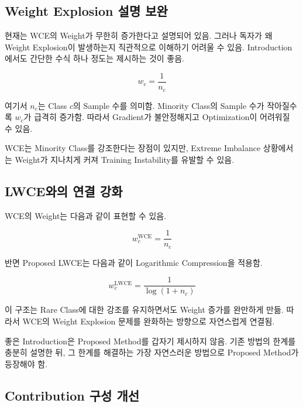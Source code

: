 \documentclass[11pt,a4paper]{article}
\begin{document}
\subsection{Weight Explosion 설명 보완}

현재는 WCE의 Weight가 무한히 증가한다고 설명되어 있음. 그러나 독자가 왜 Weight Explosion이 발생하는지 직관적으로 이해하기 어려울 수 있음. Introduction에서도 간단한 수식 하나 정도는 제시하는 것이 좋음.

\begin{equation}
w_c=\frac{1}{n_c}
\end{equation}

여기서 \(n_c\)는 Class \(c\)의 Sample 수를 의미함. Minority Class의 Sample 수가 작아질수록 \(w_c\)가 급격히 증가함. 따라서 Gradient가 불안정해지고 Optimization이 어려워질 수 있음.

\begin{tcolorbox}[title=해석]
WCE는 Minority Class를 강조한다는 장점이 있지만, Extreme Imbalance 상황에서는 Weight가 지나치게 커져 Training Instability를 유발할 수 있음.
\end{tcolorbox}

\subsection{LWCE와의 연결 강화}

WCE의 Weight는 다음과 같이 표현할 수 있음.

\begin{equation}
w_c^{\mathrm{WCE}}=\frac{1}{n_c}
\end{equation}

반면 Proposed LWCE는 다음과 같이 Logarithmic Compression을 적용함.

\begin{equation}
w_c^{\mathrm{LWCE}}=\frac{1}{\log(1+n_c)}
\end{equation}

이 구조는 Rare Class에 대한 강조를 유지하면서도 Weight 증가를 완만하게 만듦. 따라서 WCE의 Weight Explosion 문제를 완화하는 방향으로 자연스럽게 연결됨.

\begin{tcolorbox}[title= 강조할 점]
좋은 Introduction은 Proposed Method를 갑자기 제시하지 않음. 기존 방법의 한계를 충분히 설명한 뒤, 그 한계를 해결하는 가장 자연스러운 방법으로 Proposed Method가 등장해야 함.
\end{tcolorbox}

\subsection{Contribution 구성 개선}
\end{document}
